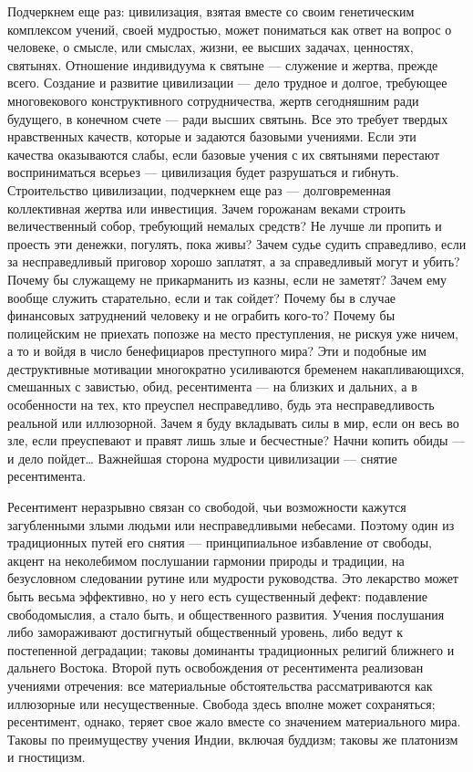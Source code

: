 \begin{multicols}{3}

Подчеркнем еще раз: цивилизация, взятая вместе со своим генетическим комплексом
учений, своей мудростью, может пониматься как ответ на вопрос о человеке, о
смысле, или смыслах, жизни, ее высших задачах, ценностях, святынях. Отношение
индивидуума к святыне — служение и жертва, прежде всего. Создание и развитие
цивилизации — дело трудное и долгое, требующее многовекового конструктивного
сотрудничества, жертв сегодняшним ради будущего, в конечном счете — ради высших
святынь. Все это требует твердых нравственных качеств, которые и задаются
базовыми учениями. Если эти качества оказываются слабы, если базовые учения с
их святынями перестают восприниматься всерьез — цивилизация будет разрушаться и
гибнуть. Строительство цивилизации, подчеркнем еще раз — долговременная
коллективная жертва или инвестиция. Зачем горожанам веками строить
величественный собор, требующий немалых средств? Не лучше ли пропить и проесть
эти денежки, погулять, пока живы? Зачем судье судить справедливо, если за
несправедливый приговор хорошо заплатят, а за справедливый могут и убить?
Почему бы служащему не прикарманить из казны, если не заметят? Зачем ему вообще
служить старательно, если и так сойдет? Почему бы в случае финансовых
затруднений человеку и не ограбить кого-то? Почему бы полицейским не приехать
попозже на место преступления, не рискуя уже ничем, а то и войдя в число
бенефициаров преступного мира? Эти и подобные им деструктивные мотивации
многократно усиливаются бременем накапливающихся, смешанных с завистью, обид,
ресентимента — на близких и дальних, а в особенности на тех, кто преуспел
несправедливо, будь эта несправедливость реальной или иллюзорной. Зачем я буду
вкладывать силы в мир, если он весь во зле, если преуспевают и правят лишь злые
и бесчестные? Начни копить обиды — и дело пойдет… Важнейшая сторона мудрости
цивилизации — снятие ресентимента.

Ресентимент неразрывно связан со свободой, чьи возможности кажутся загубленными
злыми людьми или несправедливыми небесами. Поэтому один из традиционных путей
его снятия — принципиальное избавление от свободы, акцент на неколебимом
послушании гармонии природы и традиции, на безусловном следовании рутине или
мудрости руководства. Это лекарство может быть весьма эффективно, но у него
есть существенный дефект: подавление свободомыслия, а стало быть, и
общественного развития. Учения послушания либо замораживают достигнутый
общественный уровень, либо ведут к постепенной деградации; таковы доминанты
традиционных религий ближнего и дальнего Востока. Второй путь освобождения от
ресентимента реализован учениями отречения: все материальные обстоятельства
рассматриваются как иллюзорные или несущественные. Свобода здесь вполне может
сохраняться; ресентимент, однако, теряет свое жало вместе со значением
материального мира. Таковы по преимуществу учения Индии, включая буддизм;
таковы же платонизм и гностицизм. 


\end{multicols}
